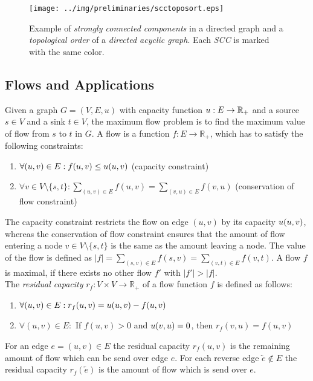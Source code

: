 \begin{figure}[ht!]
\centering
\texttt{[image: ../img/preliminaries/scctoposort.eps]}
\caption{Example of \emph{strongly connected components} in a directed graph and
         a \emph{topological order} of a \emph{directed acyclic graph}. Each 
         \emph{SCC} is marked with the same color.} 
\label{img:scctoposort}
\end{figure}

\subsection{Flows and Applications}
\label{sec:applications}

Given a graph $G = (V,E,u)$ with capacity function $u: E \rightarrow \mathbb{R}_+$ and a source 
$s \in V$ and a sink $t \in V$, the maximum flow problem is to find
the maximum value of flow from $s$ to $t$ in $G$. A flow is a function 
$f: E \rightarrow \mathbb{R}_+$, which has to satisfy the following constraints:
\begin{enumerate}
\item $\forall (u,v) \in E: f(u,v) \le u(u,v)$ (capacity constraint)
\item $\forall v \in V \setminus \{s,t\}: \sum_{(u,v) \in E} f(u,v) = \sum_{(v,u) \in E} f(v,u)$ (conservation of flow constraint)
\end{enumerate}
The capacity constraint restricts the flow on edge $(u,v)$ by its capacity 
$u(u,v)$, whereas the conservation of flow constraint ensures that the amount
of flow entering a node $v \in V \setminus \{s,t\}$ is the same as the amount leaving a node.
The value of the flow is defined as $|f| = \sum_{(s,v) \in E} f(s,v) = \sum_{(v,t) \in E} f(v,t)$.
A flow $f$ is maximal, if there exists no other flow $f'$ with $|f'| > |f|$. \\
The \emph{residual capacity} $r_f: V \times V \rightarrow \mathbb{R}_+$ of a flow function
$f$ is defined as follows:
\begin{enumerate}
\item $\forall (u,v) \in E: r_f(u,v) = u(u,v) - f(u,v)$
\item $\forall (u,v) \in E:$ If $f(u,v) > 0$ and $u(v,u) = 0$, then $r_f(v,u) = f(u,v)$
\end{enumerate}
For an edge $e = (u,v) \in E$ the residual capacity $r_f(u,v)$ is the remaining amount of 
flow which can be send over edge $e$. For each reverse edge $\overleftarrow{e} \notin E$ the
residual capacity $r_f(\overleftarrow{e})$ is the amount of flow which is send over $e$.
